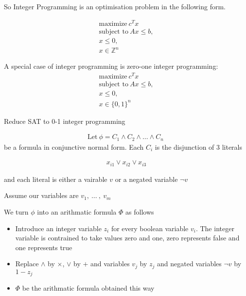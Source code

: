 \documentclass[mathserif]{beamer}
\begin{document}
\begin{frame}
So Integer Programming is an optimisation problem in the following form.

\begin{align*}
\text{maximize}\ c^Tx\\
\text{subject to}\ Ax \leq b,\\
x \leq 0,\\
x \in \mathbb{Z}^n
\end{align*}

\pause

A special case of integer programming is zero-one integer programming:
\begin{align*}
\text{maximize}\ c^Tx\\
\text{subject to}\ Ax \leq b,\\
x \leq 0,\\
x \in \{0, 1\}^n
\end{align*}
\end{frame}

Reduce SAT to 0-1 integer programming

\begin{align*}
\text{Let}\ \phi = C_1 \wedge C_2 \wedge \ldots \wedge C_n\
\end{align*}
be a formula in conjunctive normal form. Each $C_i$ is the disjunction of 3 literals

\begin{align*}
x_{i1} \vee x_{i2} \vee x_{i3}
\end{align*}

and each literal is either a vairable $v$ or a negated variable $\neg v$

Assume our variables are $v_1,\ \ldots\ ,\ v_m$

\begin{frame}
We turn $\phi$ into an arithmatic formula $\Phi$ as follows
\begin{itemize}
\item Introduce an integer variable $z_i$ for every boolean variable $v_i$. The integer variable is contrained to take values zero and one, zero represents false and one represents true
\item Replace $\wedge$ by $\times$, $\vee$ by $+$ and variables $v_j$ by $z_j$ and negated variables $\neg v$ by $1 - z_j$
\item $\Phi$ be the arithmatic formula obtained this way
\end{itemize}
\end{frame}
\end{document}
